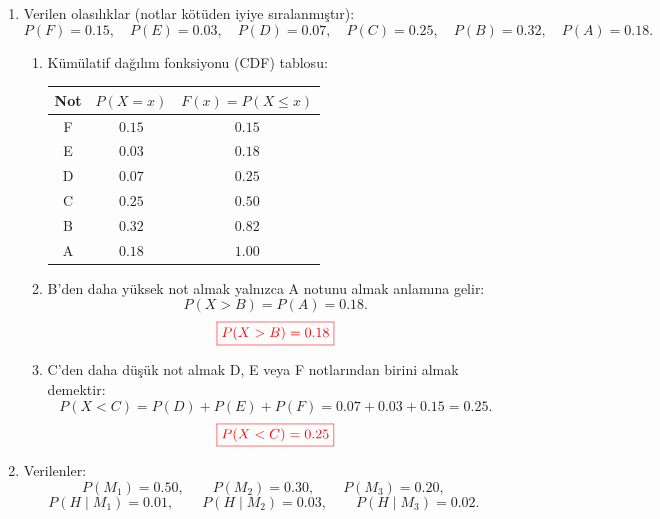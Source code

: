 \documentclass[12pt,a4paper]{article}
\begin{document}
\begin{enumerate}
\begin{enumerate}
\item $10$ oyun için beklenen toplam kazanç:
\[
10\cdot E(X)=10\cdot\frac{1}{3}=\frac{10}{3}\ \text{TL}.
\]
Başlangıç ücreti ($30$~TL) düşüldüğünde net beklenen değer:
\[
\frac{10}{3}-30=\frac{10-90}{3}=-\frac{80}{3}\ \text{TL}\approx -26{,}67\ \text{TL}.
\]
\[
{\color{red}\boxed{\text{Net beklenen kazanç}=-\frac{80}{3}\ \text{TL}\approx -26{,}67\ \text{TL}}}
\]
\end{enumerate}

\item Verilen olasılıklar (notlar kötüden iyiye sıralanmıştır):
\[
P(F)=0.15,\quad
P(E)=0.03,\quad
P(D)=0.07,\quad
P(C)=0.25,\quad
P(B)=0.32,\quad
P(A)=0.18.
\]

\begin{enumerate}
\item Kümülatif dağılım fonksiyonu (CDF) tablosu:

\begin{center}
\begin{tabular}{ccc}
\toprule
\textbf{Not} & $P(X=x)$ & $F(x)=P(X\le x)$\\
\midrule
F & $0.15$ & $0.15$\\
E & $0.03$ & $0.18$\\
D & $0.07$ & $0.25$\\
C & $0.25$ & $0.50$\\
B & $0.32$ & $0.82$\\
A & $0.18$ & $1.00$\\
\bottomrule
\end{tabular}
\end{center}

\item B'den daha yüksek not almak yalnızca A notunu almak anlamına gelir:
\[
P(X>B)=P(A)=0.18.
\]
\[
{\color{red}\boxed{P(X>B)=0.18}}
\]

\item C'den daha düşük not almak D, E veya F notlarından birini almak demektir:
\[
P(X<C)=P(D)+P(E)+P(F)=0.07+0.03+0.15=0.25.
\]
\[
{\color{red}\boxed{P(X<C)=0.25}}
\]
\end{enumerate}

\item Verilenler:
\[
P(M_1)=0.50,\qquad P(M_2)=0.30,\qquad P(M_3)=0.20,
\]
\[
P(H\mid M_1)=0.01,\qquad P(H\mid M_2)=0.03,\qquad P(H\mid M_3)=0.02.
\]


\end{enumerate}
\end{document}

